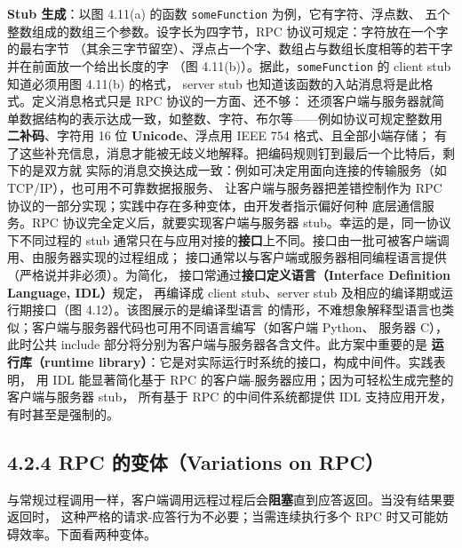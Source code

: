 \medskip\noindent\textbf{Stub 生成}：以图 4.11(a) 的函数 \texttt{someFunction} 为例，它有字符、浮点数、
五个整数组成的数组三个参数。设字长为四字节，RPC 协议可规定：字符放在一个字的最右字节
（其余三字节留空）、浮点占一个字、数组占与数组长度相等的若干字并在前面放一个给出长度的字
（图 4.11(b)）。据此，\texttt{someFunction} 的 client stub 知道必须用图 4.11(b) 的格式，
server stub 也知道该函数的入站消息将是此格式。定义消息格式只是 RPC 协议的一方面、还不够：
还须客户端与服务器就简单数据结构的表示达成一致，如整数、字符、布尔等——例如协议可规定整数用
\textbf{二补码}、字符用 16 位 \textbf{Unicode}、浮点用 IEEE 754 格式、且全部小端存储；
有了这些补充信息，消息才能被无歧义地解释。把编码规则钉到最后一个比特后，剩下的是双方就
实际的消息交换达成一致：例如可决定用面向连接的传输服务（如 TCP/IP），也可用不可靠数据报服务、
让客户端与服务器把差错控制作为 RPC 协议的一部分实现；实践中存在多种变体，由开发者指示偏好何种
底层通信服务。RPC 协议完全定义后，就要实现客户端与服务器 stub。幸运的是，同一协议下不同过程的
stub 通常只在与应用对接的\textbf{接口}上不同。接口由一批可被客户端调用、由服务器实现的过程组成；
接口通常以与客户端或服务器相同编程语言提供（严格说并非必须）。为简化，
接口常通过\textbf{接口定义语言（Interface Definition Language, IDL）}规定，
再编译成 client stub、server stub 及相应的编译期或运行期接口（图 4.12）。该图展示的是编译型语言
的情形，不难想象解释型语言也类似；客户端与服务器代码也可用不同语言编写（如客户端 Python、
服务器 C），此时公共 include 部分将分别为客户端与服务器各含文件。此方案中重要的是
\textbf{运行库（runtime library）}：它是对实际运行时系统的接口，构成中间件。实践表明，
用 IDL 能显著简化基于 RPC 的客户端-服务器应用；因为可轻松生成完整的客户端与服务器 stub，
所有基于 RPC 的中间件系统都提供 IDL 支持应用开发，有时甚至是强制的。

\begin{closeread}
\end{closeread}


\subsection*{4.2.4 RPC 的变体（Variations on RPC）}
与常规过程调用一样，客户端调用远程过程后会\textbf{阻塞}直到应答返回。当没有结果要返回时，
这种严格的请求-应答行为不必要；当需连续执行多个 RPC 时又可能妨碍效率。下面看两种变体。

